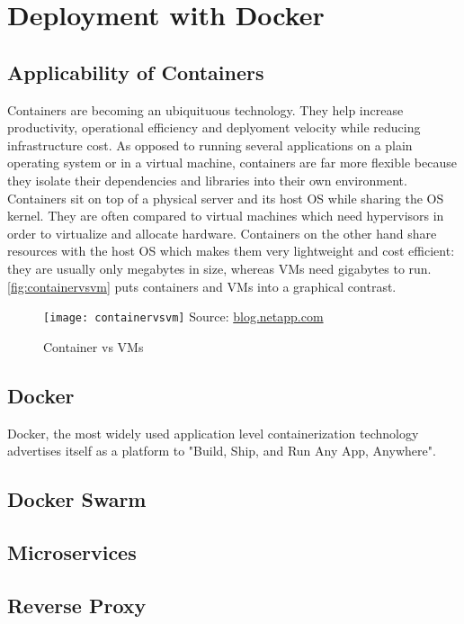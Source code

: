 \chapter[Deployment]{Deployment with Docker} \label{ch:deployment}

\section{Applicability of Containers}
Containers are becoming an ubiquituous technology. They help increase productivity, operational efficiency and deplyoment velocity while reducing infrastructure cost. As opposed to running several applications on a plain operating system or in a virtual machine, containers are far more flexible because they isolate their dependencies and libraries into their own environment. Containers sit on top of a physical server and its host OS while sharing the OS kernel. They are often compared to virtual machines which need hypervisors in order to virtualize and allocate hardware. Containers on the other hand share resources with the host OS which makes them very lightweight and cost efficient: they are usually only megabytes in size, whereas VMs need gigabytes to run. \autoref{fig:containervsvm} puts containers and VMs into a graphical contrast.

\begin{figure}[H]
    \begin{center}
    \texttt{[image: containervsvm]}
    Source: \href{https://blog.netapp.com/wp-content/uploads/2016/03/Screen-Shot-2018-03-20-at-9.24.09-AM-1024x548.png}{blog.netapp.com}
    \end{center}
    \caption{Container vs VMs}
    \label{fig:containervsvm}
\end{figure}
  

\section{Docker}
Docker, the most widely used application level containerization technology advertises itself as a platform to "Build, Ship, and Run Any App, Anywhere".

\section{Docker Swarm}

\section{Microservices}

\section{Reverse Proxy}